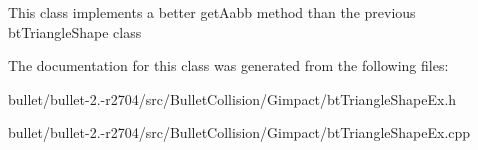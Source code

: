 This class implements a better get\+Aabb method than the previous bt\+Triangle\+Shape class 

The documentation for this class was generated from the following files\+:\begin{DoxyCompactItemize}
\item 
bullet/bullet-\/2.-\/r2704/src/\+Bullet\+Collision/\+Gimpact/bt\+Triangle\+Shape\+Ex.\+h\item 
bullet/bullet-\/2.-\/r2704/src/\+Bullet\+Collision/\+Gimpact/bt\+Triangle\+Shape\+Ex.\+cpp\end{DoxyCompactItemize}
